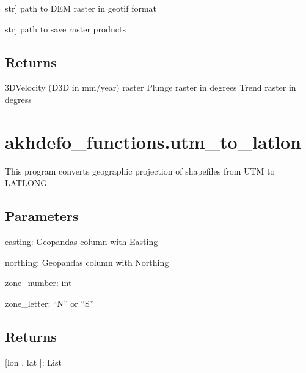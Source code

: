 \documentclass[letterpaper,10pt]{sphinxmanual}
\begin{document}
\begin{fulllineitems}
\begin{description}
\sphinxlineitem{demFile}{[}str{]}
\sphinxAtStartPar
path to DEM raster in geotif format

\sphinxlineitem{output\_folder}{[}str{]}
\sphinxAtStartPar
path to save raster products

\end{description}


\section{Returns}
\label{\detokenize{generated/akhdefo_functions.Akhdefo_inversion:returns}}\begin{description}
\sphinxAtStartPar
3D\sphinxhyphen{}Velocity (D3D in mm/year) raster
Plunge raster in degrees
Trend raster in degress

\end{description}

\end{fulllineitems}


\sphinxstepscope


\chapter{akhdefo\_functions.utm\_to\_latlon}
\label{\detokenize{generated/akhdefo_functions.utm_to_latlon:akhdefo-functions-utm-to-latlon}}\label{\detokenize{generated/akhdefo_functions.utm_to_latlon::doc}}

\begin{fulllineitems}
\label{\detokenize{generated/akhdefo_functions.utm_to_latlon:akhdefo_functions.utm_to_latlon}}
\pysigstartsignatures
{}
\pysigstopsignatures
\sphinxAtStartPar
This program converts geographic projection of shapefiles from UTM to LATLONG


\section{Parameters}
\label{\detokenize{generated/akhdefo_functions.utm_to_latlon:parameters}}
\sphinxAtStartPar
easting: Geopandas column with Easting

\sphinxAtStartPar
northing: Geopandas column with Northing

\sphinxAtStartPar
zone\_number: int

\sphinxAtStartPar
zone\_letter: “N” or “S”


\section{Returns}
\label{\detokenize{generated/akhdefo_functions.utm_to_latlon:returns}}
\sphinxAtStartPar
{[}lon , lat {]}: List

\end{fulllineitems}
\end{document}
